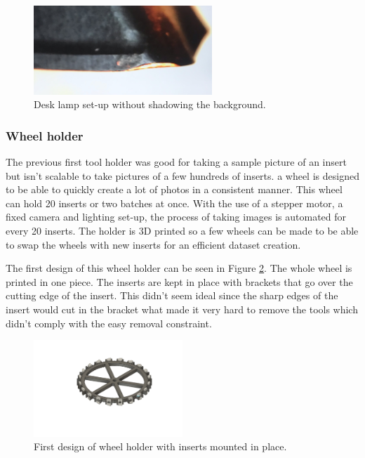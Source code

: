 	
	\begin{figure}[hbtp]
		\centering
		\includegraphics[width=0.6\textwidth]{fig/Camera_setup/Light/Desk_Lamp_Test/desk_lamp_setup_whitebg.jpeg}
		\caption{Desk lamp set-up without shadowing the background.}
		\label{fig:setup:desklamp:whitebg}
	\end{figure}
	

	\subsubsection{Wheel holder}
	\label{sec:impl:camerasetup:wheelholder}
	The previous first tool holder was good for taking a sample picture of an insert but isn't scalable to take pictures of a few hundreds of inserts.
	a wheel is designed to be able to quickly create a lot of photos in a consistent manner.  This wheel can hold 20 inserts or two batches at once. With the use of a stepper motor, a fixed camera and lighting set-up, the process of taking images is automated for every 20 inserts. The holder is 3D printed so a few wheels can be made to be able to swap the wheels with new inserts for an efficient dataset creation.
	
		The first design of this wheel holder can be seen in Figure \ref{fig:setup:wheelholder1:inserts}. 
		The whole wheel is printed in one piece. The inserts are kept in place with brackets that go over the cutting edge of the insert. This didn't seem ideal since the sharp edges of the insert would cut in the bracket what made it very hard to remove the tools which didn't comply with the easy removal constraint. 
		
		\begin{figure}[hbtp]
		\centering
		\includegraphics[width=0.5\textwidth]{fig/Camera_setup/Tool_Holder/Wheel_Holder/first_wheel_holder/radhouderV1_model_inserts.png}
		\caption{First design of wheel holder with inserts mounted in place.}
		\label{fig:setup:wheelholder1:inserts}
		\end{figure}
		
